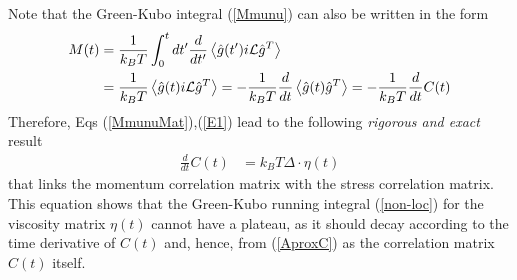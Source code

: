 \documentclass[b5paper,openright,11pt]{book}
\newcommand{\esc}{\!\cdot\!}
\newcommand{\llangle}{\left\langle}
\newcommand{\rrangle}{\right\rangle}
\begin{document}
Note that the Green-Kubo integral (\ref{Mmunu}) can also be written
in the form
\begin{align}
    M(t)&= \frac{1}{k_BT} \int_0^t dt'\frac{d}{dt'}\llangle \hat{g}(t') i{\cal L}\hat{g}^T\rrangle
\nonumber\\
&= \frac{1}{k_BT} \llangle \hat{g}(t) i{\cal L}\hat{g}^T\rrangle
=  -\frac{1}{k_BT}\frac{d}{dt}\llangle \hat{g}(t) \hat{g}^T\rrangle=-\frac{1}{k_BT}\frac{d}{dt}C(t)
\label{E1}
\end{align}
Therefore,  Eqs  (\ref{MmunuMat}),(\ref{E1})  lead  to  the  following
\textit{rigorous and exact} result
\begin{align}
\frac{d}{dt}C(t)&= k_BT \Delta\esc \eta(t)
\label{etaExact}
\end{align}
that links the momentum correlation matrix with the stress correlation
matrix.  This  equation shows  that  the  Green-Kubo running  integral
(\ref{non-loc})  for  the viscosity  matrix  $\eta(t)$  cannot have  a
plateau, as it should decay according to the time derivative of $C(t)$
and,  hence, from  (\ref{AproxC})  as the  correlation matrix  $C(t)$
itself.
\end{document}
